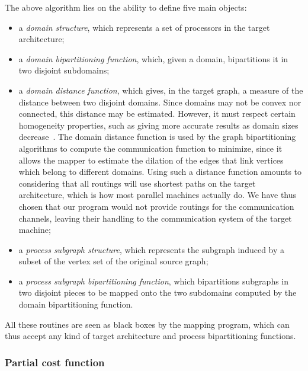 The above algorithm lies on the ability to define five main objects:
\begin{itemize}
\item
a \emph{domain structure}, which represents a set of processors in the target
architecture;
\item
a \emph{domain bipartitioning function}, which, given a domain, bipartitions
it in two disjoint subdomains;
\item
a \emph{domain distance function}, which gives, in the target graph, a measure
of the distance between two disjoint domains. Since domains may not be convex
nor connected, this distance may be estimated.
However, it must respect certain homogeneity properties, such as
giving more accurate results as domain sizes
decrease~\cite{pero96b,pellegrini:hal-01671156}.
The domain distance function is used by the graph bipartitioning algorithms
to compute the communication function to minimize, since it allows the mapper
to estimate the dilation of the edges that link vertices which belong to
different domains.
Using such a distance function amounts to considering that all routings
will use shortest paths on the target architecture, which is how most
parallel machines actually do.
We have thus chosen that our program would not provide routings for the
communication channels, leaving their handling to the communication system of
the target machine;
\item
a \emph{process subgraph structure}, which represents the subgraph induced by a
subset of the vertex set of the original source graph;
\item
a \emph{process subgraph bipartitioning function}, which bipartitions subgraphs
in two disjoint pieces to be mapped onto the two subdomains computed by
the domain bipartitioning function.
\end{itemize}
All these routines are seen as black boxes by the mapping program, which can
thus accept any kind of target architecture and process bipartitioning
functions.

\subsubsection{Partial cost function}

